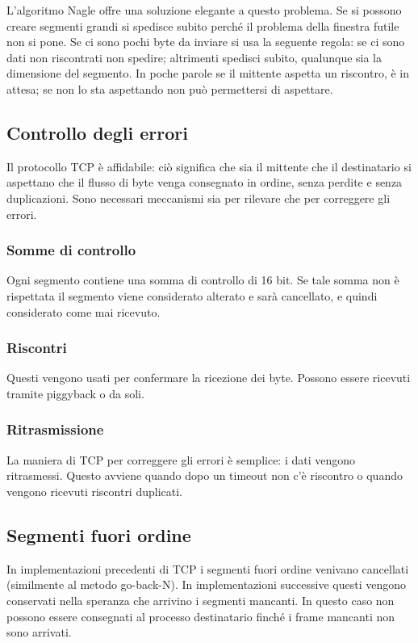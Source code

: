             L'algoritmo Nagle offre una soluzione elegante a questo problema. Se si possono creare segmenti grandi si spedisce subito perché il problema della finestra futile non si pone. Se ci sono pochi byte da inviare si usa la seguente regola: se ci sono dati non riscontrati non spedire; altrimenti spedisci subito, qualunque sia la dimensione del segmento. In poche parole se il mittente aspetta un riscontro, è in attesa; se non lo sta aspettando non può permettersi di aspettare.
            
    \subsection{Controllo degli errori}
        Il protocollo TCP è affidabile: ciò significa che sia il mittente che il destinatario si aspettano che il flusso di byte venga consegnato in ordine, senza perdite e senza duplicazioni. Sono necessari meccanismi sia per rilevare che per correggere gli errori.
        
        \subsubsection{Somme di controllo}
            Ogni segmento contiene una somma di controllo di 16 bit. Se tale somma non è rispettata il segmento viene considerato alterato e sarà cancellato, e quindi considerato come mai ricevuto.
            
        \subsubsection{Riscontri}
            Questi vengono usati per confermare la ricezione dei byte. Possono essere ricevuti tramite piggyback o da soli.
            
        \subsubsection{Ritrasmissione}
            La maniera di TCP per correggere gli errori è semplice: i dati vengono ritrasmessi. Questo avviene quando dopo un timeout non c'è riscontro o quando vengono ricevuti riscontri duplicati.
            
        \subsection{Segmenti fuori ordine}
            In implementazioni precedenti di TCP i segmenti fuori ordine venivano cancellati (similmente al metodo go-back-N). In implementazioni successive questi vengono conservati nella speranza che arrivino i segmenti mancanti. In questo caso non possono essere consegnati al processo destinatario finché i frame mancanti non sono arrivati.